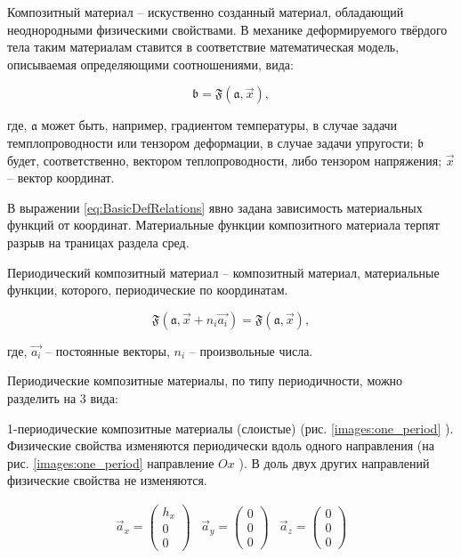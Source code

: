 Композитный материал -- искуственно созданный материал, обладающий неоднородными физическими свойствами.
В механике деформируемого твёрдого тела таким материалам ставится в соответствие математическая модель, описываемая определяющими соотношениями, вида:

\begin{equation}
    \label{eq:BasicDefRelations}
    \mathfrak{b} = \mathfrak{F}(\mathfrak{a}, \vec{x}),
\end{equation}

где, 
$\mathfrak{a}$ 
может быть, например, градиентом температуры, в случае задачи темплопроводности или тензором деформации, в случае задачи упругости; 
$\mathfrak{b}$ 
будет, соответственно, вектором теплопроводности, либо тензором напряжения; 
$\vec{x}$ 
-- вектор координат.

В выражении 
\ref{eq:BasicDefRelations} 
явно задана зависимость материальных функций от координат.
Материальные функции композитного материала терпят разрыв на траницах раздела сред.


Периодический композитный материал -- композитный материал, материальные функции, которого, периодические по координатам.

\begin{equation}
    \label{eq:BasicPeriodicFuction}
    \mathfrak{F}(\mathfrak{a}, \vec{x} + n_i\vec{a_i}) = \mathfrak{F}(\mathfrak{a}, \vec{x}),
\end{equation}

где, 
$\vec{a_i}$ 
-- постоянные векторы, 
$n_i$ 
-- произвольные числа.

Периодические композитные материалы, по типу периодичности, можно разделить на 3 вида:

1-периодические композитные материалы (слоистые) (рис. 
\ref{images:one_period}
).
Физические свойства изменяются периодически вдоль одного направления (на рис. 
\ref{images:one_period}
направление 
$Ox$
). В доль двух других направлений физические свойства не изменяются.

\begin{equation}
    \begin{array}{ccc}
    \vec{a}_x = \left(\begin{array}{c}h_x\\0\\0\end{array}\right) & 
    \vec{a}_y = \left(\begin{array}{c}0\\0\\0\end{array}\right) & 
    \vec{a}_z = \left(\begin{array}{c}0\\0\\0\end{array}\right)
    \end{array}
\end{equation}

